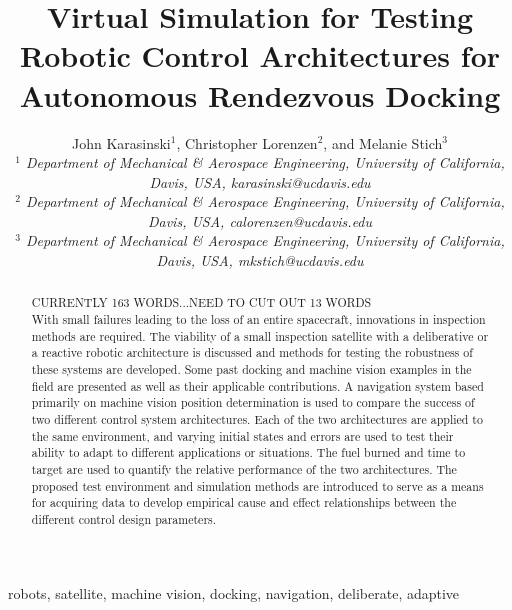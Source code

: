 \documentclass[journal, 10pt]{IEEEtran}
\begin{document}
\title{Virtual Simulation for Testing Robotic Control Architectures for Autonomous Rendezvous Docking }

\author{John Karasinski$^1$, Christopher Lorenzen$^2$, and Melanie Stich$^3$\\\textit{$^1$ Department of Mechanical \& Aerospace Engineering, University of California, Davis, USA, karasinski@ucdavis.edu}
\\\textit{$^2$ Department of Mechanical \& Aerospace Engineering, University of California, Davis, USA, calorenzen@ucdavis.edu}\\\textit{$^3$ Department of Mechanical \& Aerospace Engineering, University of California, Davis, USA, mkstich@ucdavis.edu}
}

\maketitle

\begin{abstract}
CURRENTLY 163 WORDS...NEED TO CUT OUT 13 WORDS \\
With small failures leading to the loss of an entire spacecraft, innovations in inspection methods are required.  The viability of a small inspection satellite with a deliberative or a reactive robotic architecture is discussed and methods for testing the robustness of these systems are developed.  Some past docking and machine vision examples in the field are presented as well as their applicable contributions.  A navigation system based primarily on machine vision position determination is used to compare the success of two different control system architectures.  Each of the two architectures are applied to the same environment, and varying initial states and errors are used to test their ability to adapt to different applications or situations.  The fuel burned and time to target are used to quantify the relative performance of the two architectures.  The proposed test environment and simulation methods are introduced to serve as a means for acquiring data to develop empirical cause and effect relationships between the different control design parameters.
\end{abstract}

\begin{IEEEkeywords}
robots, satellite, machine vision, docking, navigation, deliberate, adaptive
\end{IEEEkeywords}
\end{document}
